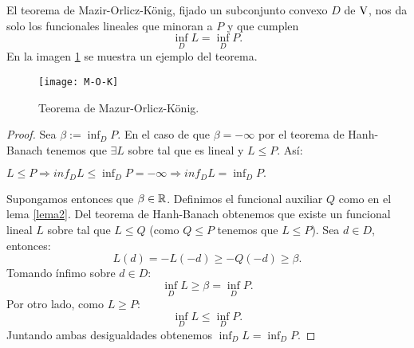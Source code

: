 El teorema de Mazir-Orlicz-König, fijado un subconjunto convexo $ D $ de $ \vecSpace $, nos da solo los funcionales lineales que minoran a $ P $ y que cumplen
\[
\inf_D L = \inf_D P.
\]
En la imagen \ref{M-O-K-fotos} se muestra un ejemplo del teorema.
\begin{figure}[h!]
	\centering
	\texttt{[image: M-O-K]}
	\caption{Teorema de Mazur-Orlicz-König.}
	\label{M-O-K-fotos}
\end{figure} 

	\begin{proof}
		Sea $ \beta := \inf_D P $. En el caso de que $ \beta = -\infty $ por el teorema de Hanh-Banach tenemos que $ \exists L $ sobre \vecSpace tal que es lineal y $ L \leq P$. Así:
		\begin{center}
			$ L \leq P \Longrightarrow inf_D L \leq \inf_D P = -\infty \Longrightarrow inf_D L = \inf_D P.$ 
		\end{center}
		Supongamos entonces que $ \beta \in \mathbb{R} $. Definimos el funcional auxiliar $ Q $ como en el lema \ref{lema2}. Del teorema de Hanh-Banach obtenemos que existe un funcional lineal $ L $ sobre \vecSpace tal que $ L \leq Q$ (como $ Q \leq P $ tenemos que $ L \leq P $). Sea $ d \in D $, entonces:
		\[
		L(d) = -L(-d) \geq -Q(-d) \geq \beta.
		\]
		Tomando ínfimo sobre $ d \in D $:
		\[
		\inf_D L \geq \beta = \inf_D P.
		\]
		Por otro lado, como $ L \geq P $:
		\[
		\inf_D L \leq\inf_D P.
		\]
		Juntando ambas desigualdades obtenemos $ \inf_D L =\inf_D P $.
	\end{proof}

\bigskip

